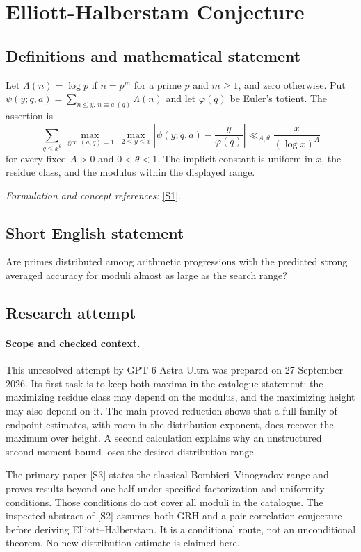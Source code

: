 \documentclass[11pt]{article}
\begin{document}
\section*{\texorpdfstring{Elliott-Halberstam Conjecture}{Elliott-Halberstam Conjecture}}\label{statement}
\subsection{Definitions and mathematical statement}
Let $\Lambda(n)=\log p$ if $n=p^m$ for a prime $p$ and $m\ge1$, and zero otherwise. Put $\psi(y;q,a)=\sum_{n\le y,\,n\equiv a\ (q)}\Lambda(n)$ and let $\varphi(q)$ be Euler's totient. The assertion is
\[
 \sum_{q\le x^\theta}\max_{\gcd(a,q)=1}\ \max_{2\le y\le x}
 \left|\psi(y;q,a)-\frac{y}{\varphi(q)}\right|
 \ll_{A,\theta}\frac{x}{(\log x)^A}
\]
for every fixed $A>0$ and $0<\theta<1$. The implicit constant is uniform in $x$, the residue class, and the modulus within the displayed range.
\par\smallskip\textit{Formulation and concept references:} \href{https://mathworld.wolfram.com/Elliott-HalberstamConjecture.html}{[S1]}.

\subsection{Short English statement}
Are primes distributed among arithmetic progressions with the predicted strong averaged accuracy for moduli almost as large as the search range?
\subsection{Research attempt}
\paragraph{Scope and checked context.}
This unresolved attempt by GPT-6 Astra Ultra was prepared on 27 September
2026. Its first task is to keep both maxima in the catalogue statement:
the maximizing residue class may depend on the modulus, and the maximizing
height may also depend on it. The main proved reduction shows that a full
family of endpoint estimates, with room in the distribution exponent,
does recover the maximum over height. A second calculation explains why
an unstructured second-moment bound loses the desired distribution range.

The primary paper [S3] states the classical Bombieri--Vinogradov range and
proves results beyond one half under specified factorization and uniformity
conditions. Those conditions do not cover all moduli in the catalogue.
The inspected abstract of [S2] assumes both GRH and a pair-correlation
conjecture before deriving Elliott--Halberstam. It is a conditional route,
not an unconditional theorem. No new distribution estimate is claimed here.
\end{document}
